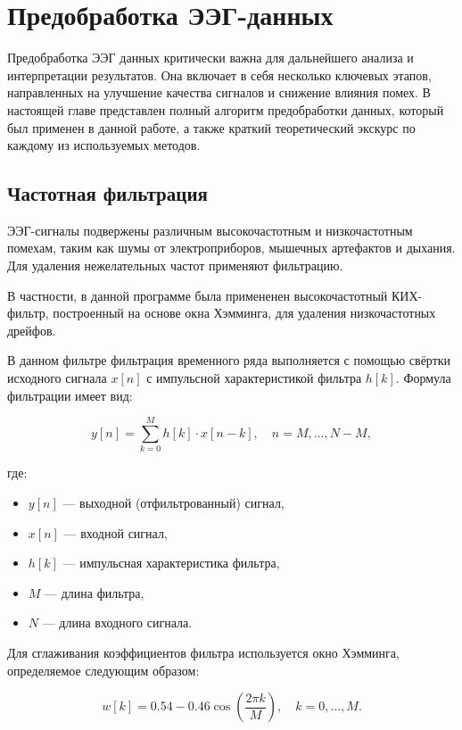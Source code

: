 \chapter{Предобработка ЭЭГ-данных}
\label{ch:chap1}
Предобработка ЭЭГ данных критически важна для дальнейшего анализа и интерпретации результатов. Она включает в себя несколько ключевых этапов, направленных на улучшение качества сигналов и снижение влияния помех. В настоящей главе представлен полный алгоритм предобработки данных, который был применен в данной работе, а также краткий теоретический экскурс по каждому из используемых методов.

\section{Частотная фильтрация}
\label{sec:freq-filtr}
ЭЭГ-сигналы подвержены различным высокочастотным и низкочастотным помехам, таким как шумы от электроприборов, мышечных артефактов и дыхания. Для удаления нежелательных частот применяют фильтрацию.

В частности, в данной программе была примененен высокочастотный КИХ-фильтр, построенный на основе окна Хэмминга, для удаления низкочастотных дрейфов.

В данном фильтре фильтрация временного ряда выполняется с помощью свёртки исходного сигнала \(x[n]\) с импульсной характеристикой фильтра \(h[k]\). Формула фильтрации имеет вид:

\begin{equation}
y[n] = \sum_{k=0}^{M} h[k] \cdot x[n-k], \quad n = M, \dots, N-M,
\label{eq:fir_filter}
\end{equation}

где:
\begin{itemize}
    \item \(y[n]\) — выходной (отфильтрованный) сигнал,
    \item \(x[n]\) — входной сигнал,
    \item \(h[k]\) — импульсная характеристика фильтра,
    \item \(M\) — длина фильтра,
    \item \(N\) — длина входного сигнала.
\end{itemize}

Для сглаживания коэффициентов фильтра используется окно Хэмминга, определяемое следующим образом:

\begin{equation}
w[k] = 0.54 - 0.46 \cos\left( \frac{2 \pi k}{M} \right), \quad k = 0, \dots, M.
\label{eq:hamming_window}
\end{equation}

